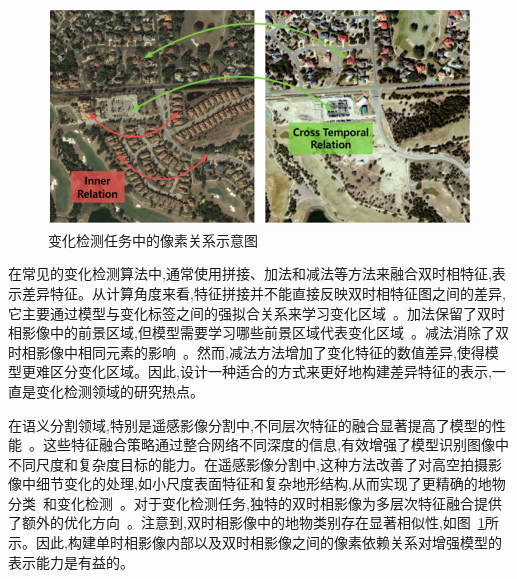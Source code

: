 \begin{figure}[!htb]
  \centering
  \includegraphics[width=\textwidth]{paper_figures/基于双时相遥感影像特征交互的变化检测算法研究/EfficientCD/efficientcd_relation.png}
  \caption{变化检测任务中的像素关系示意图}
  \label{fig:efficientcd_relation}
\end{figure}

在常见的变化检测算法中,通常使用拼接、加法和减法等方法来融合双时相特征,表示差异特征。从计算角度来看,特征拼接并不能直接反映双时相特征图之间的差异,它主要通过模型与变化标签之间的强拟合关系来学习变化区域~\cite{Daudt2018FullyCS}。加法保留了双时相影像中的前景区域,但模型需要学习哪些前景区域代表变化区域~\cite{gu2023fdff}。减法消除了双时相影像中相同元素的影响~\cite{feng_change_2023}。然而,减法方法增加了变化特征的数值差异,使得模型更难区分变化区域。因此,设计一种适合的方式来更好地构建差异特征的表示,一直是变化检测领域的研究热点。

在语义分割领域,特别是遥感影像分割中,不同层次特征的融合显著提高了模型的性能~\cite{Dong2021AMF, lin_feature_2017}。这些特征融合策略通过整合网络不同深度的信息,有效增强了模型识别图像中不同尺度和复杂度目标的能力。在遥感影像分割中,这种方法改善了对高空拍摄影像中细节变化的处理,如小尺度表面特征和复杂地形结构,从而实现了更精确的地物分类~\cite{wang2022unetformer}和变化检测~\cite{dong_changeclip_2024}。对于变化检测任务,独特的双时相影像为多层次特征融合提供了额外的优化方向~\cite{dong_changeclip_2024, Li2023MDFENetAM}。注意到,双时相影像中的地物类别存在显著相似性,如图~\ref{fig:efficientcd_relation}所示。因此,构建单时相影像内部以及双时相影像之间的像素依赖关系对增强模型的表示能力是有益的。

